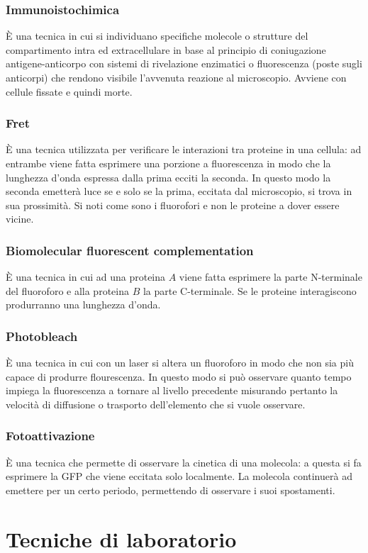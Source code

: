 \subsubsection{Immunoistochimica}
\`E una tecnica in cui si individuano specifiche molecole o strutture del compartimento intra ed extracellulare in base al principio di coniugazione antigene-anticorpo con sistemi di 
rivelazione enzimatici o fluorescenza (poste sugli anticorpi) che rendono visibile l'avvenuta reazione al microscopio. Avviene con cellule fissate e quindi morte.
\subsubsection{Fret}
\`E una tecnica utilizzata per verificare le interazioni tra proteine in una cellula: ad entrambe viene fatta esprimere una porzione a fluorescenza in modo che la lunghezza d'onda 
espressa dalla prima ecciti la seconda. In questo modo la seconda emetter\`a luce se e solo se la prima, eccitata dal microscopio, si trova in sua prossimit\`a. Si noti come sono i 
fluorofori e non le proteine a dover essere vicine. 
\subsubsection{Biomolecular fluorescent complementation}
\`E una tecnica in cui ad una proteina $A$ viene fatta esprimere la parte N-terminale del fluoroforo e alla proteina $B$ la parte C-terminale. Se le proteine interagiscono produrranno
una lunghezza d'onda. 
\subsubsection{Photobleach}
\`E una tecnica in cui con un laser si altera un fluoroforo in modo che non sia pi\`u capace di produrre flourescenza. In questo modo si pu\`o osservare quanto tempo impiega la 
fluorescenza a tornare al livello precedente misurando pertanto la velocit\`a di diffusione o trasporto dell'elemento che si vuole osservare. 
\subsubsection{Fotoattivazione}
\`E una tecnica che permette di osservare la cinetica di una molecola: a questa si fa esprimere la GFP che viene eccitata solo localmente. La molecola continuer\`a ad emettere per un
certo periodo, permettendo di osservare i suoi spostamenti. 
\section{Tecniche di laboratorio}
